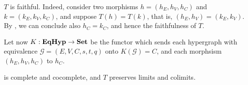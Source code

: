 \begin{remark}
	$T$ is faithful. Indeed, consider two morphisms $h = (h_E, h_V, h_C)$ and $k = (k_E, k_V, k_C)$, and suppose $T(h) = T(k)$, that is, $(h_E, h_V) = (k_E, k_V)$.
	By , we can conclude also $h_C = k_C$, and hence the faithfulness of $T$.
\end{remark}

Let now $K: \textbf{\textup{EqHyp}} \to \mathbf{Set}$ be the functor which sends each hypergraph with equivalence $\mathcal{G} = (E, V, C, s, t, q)$ onto $K(\mathcal{G}) = C$, and each morphsism $(h_E, h_V, h_C)$ to $h_C$.

\begin{proposition}\label{prop:eqhyp_complete}
	\EqHyp is complete and cocomplete, and $T$ preserves limits and colimits.
\end{proposition}

